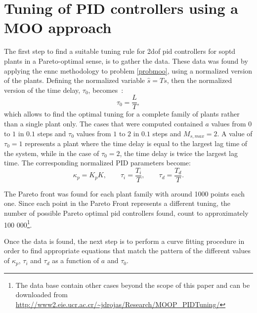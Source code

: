 \section{Tuning of PID controllers using a MOO approach}
\label{PID_Tuning}
The first step to find a suitable tuning rule for \gls{2dof} \gls{pid} controllers for \gls{soptd} plants in a Pareto-optimal sense, is to gather the data. These data was found by applying the \gls{ennc} methodology to problem \eqref{probmoo}, using a normalized version of the plants. Defining the normalized variable $\hat{s}=T s$, then the normalized version of the time delay, $\tau_0$, becomes~\cite{Alfaro2013}:
\begin{equation}
\tau_0 = \frac{L}{T},
\label{eq:tauNorm}
\end{equation}
which allows to find the optimal tuning for a complete family of plants rather than a single plant only. The cases that were computed contained $a$ values from $0$ to $1$ in $0.1$ steps and $\tau_0$ values from $1$ to $2$ in $0.1$ steps and $M_{s,max}=2$. A value of $\tau_0=1$ represents a plant where the time delay is equal to the largest lag time of the system, while in the case of $\tau_0=2$, the time delay is twice the largest lag time. The corresponding normalized PID parameters become:
\begin{equation}
\kappa_p = K_p K, \qquad \tau_i=\frac{T_i}{T}, \qquad \tau_d = \frac{T_d}{T}.
\label{eq:PIDNormParam}
\end{equation}
%

The Pareto front was found for each plant family with around 1000 points each one. Since each point in the Pareto Front represents a different tuning, the number of possible Pareto optimal \gls{pid} controllers found, count to approximately 100 000\footnote{The data base contain other cases beyond the scope of this paper and can be downloaded from \url{http://www2.eie.ucr.ac.cr/~jdrojas/Research/MOOP_PIDTuning/}}.

Once the data is found, the next step is to perform a curve fitting procedure in order to find appropriate equations that match the pattern of the different values of $\kappa_p$, $\tau_i$ and $\tau_d$ as a function of $a$ and $\tau_0$.

